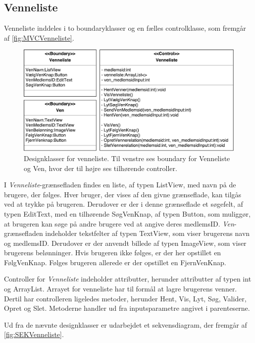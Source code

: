\subsection*{Venneliste}
Venneliste inddeles i to boundaryklasser og en fælles controlklasse, som fremgår af \autoref{fig:MVCVenneliste}. 

\begin{figure} [H]
\centering
\includegraphics[width=1\textwidth]{figures/MVC/MVCVenneliste}
\caption{Designklasser for venneliste. Til venstre ses boundary for Venneliste og Ven, hvor der til højre ses tilhørende controller.}
\label{fig:MVCVenneliste}
\end{figure}

\noindent
I \textit{Venneliste}-grænsefladen findes en liste, af typen ListView, med navn på de brugere, der følges. Hver bruger, der vises af den givne grænseflade, kan tilgås ved at trykke på brugeren. Derudover er der i denne grænseflade et søgefelt, af typen EditText, med en tilhørende SøgVenKnap, af typen Button, som muliggør, at brugeren kan søge på andre brugere ved at angive deres medlemsID. 
\textit{Ven}-grænsefladen indeholder tekstfelter af typen TextView, som viser brugerens navn og medlemsID. Derudover er der anvendt billede af typen ImageView, som viser brugerens belønninger. Hvis brugeren ikke følges, er der her opstillet en FølgVenKnap. Følges brugeren allerede er der opstillet en FjernVenKnap. 

Controller for \textit{Venneliste} indeholder attributter, herunder attributter af typen int og ArrayList. Arrayet for venneliste har til formål at lagre brugerens venner. Dertil har controlleren ligeledes metoder, herunder Hent, Vis, Lyt, Søg, Valider, Opret og Slet. Metoderne handler ud fra inputsparametre angivet i parenteserne. 

Ud fra de nævnte designklasser er udarbejdet et sekvensdiagram, der fremgår af \autoref{fig:SEKVenneliste}.

